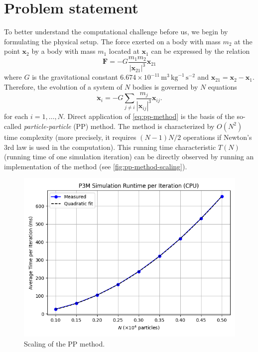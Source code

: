 \section{Problem statement}
To better understand the computational challenge before us, we begin by formulating the physical setup.
The force exerted on a body with mass $m_2$ at the point $\mathbf{x}_2$ by a body with mass $m_1$ located at $\mathbf{x}_1$ can be expressed by the relation
\begin{equation}\label{eq:law-of-uni-grav}
    \mathbf{F} = -G\frac{m_1m_2}{|\mathbf{x}_{21}|^3}\mathbf{x}_{21}
\end{equation}
where $G$ is the gravitational constant $6.674\times 10^{-11}\, \mathrm{m}^3 \,\mathrm{kg}^{-1}\,\mathrm{s}^{-2}$ and $\mathbf{x}_{21} = \mathbf{x}_2 - \mathbf{x}_1$.
Therefore, the evolution of a system of $N$ bodies is governed by $N$ equations
\begin{equation}\label{eq:pp-method}
    \ddot{\mathbf{x}}_i = -G\sum_{j\neq i} \frac{m_j}{|\mathbf{x}_{ij}|^3}\mathbf{x}_{ij}.
\end{equation}
for each $i = 1,\dots, N$.
Direct application of \autoref{eq:pp-method} is the basis of the so-called \textit{particle-particle} (PP) method.
The method is characterized by $O(N^2)$ time complexity (more precisely, it requires $(N-1)N/2$ operations if Newton's 3rd law is used in the computation).
This running time characteristic $T(N)$ (running time of one simulation iteration) can be directly observed by running an implementation of the method (see \autoref{fig:pp-method-scaling}).
\begin{figure}[htp]
    \centering
    \includegraphics[scale=0.5]{chapters/introduction/img/pp_time.png}
    \caption{Scaling of the PP method.}
    \label{fig:pp-method-scaling}
\end{figure}
